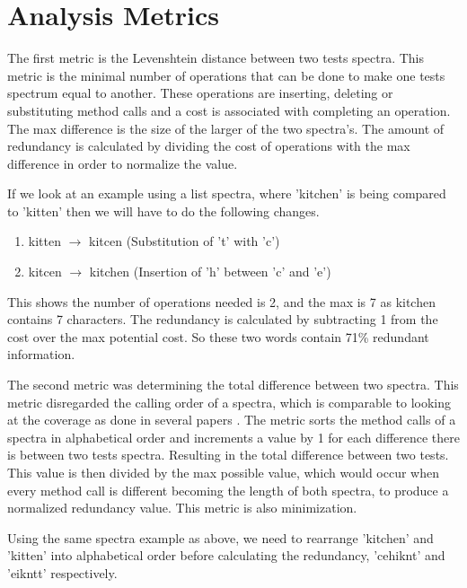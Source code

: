 \section{Analysis Metrics}
\label{S:metrics}

The first metric is the Levenshtein distance between two tests spectra. This metric is the minimal number of operations that can be done to make one tests spectrum equal to another. These operations are inserting, deleting or substituting method calls and a cost is associated with completing an operation. The max difference is the size of the larger of the two spectra's. The amount of redundancy is calculated by dividing the cost of operations with the max difference in order to normalize the value. 

If we look at an example using a list spectra, where 'kitchen' is being compared to 'kitten' then we will have to do the following changes.

\begin{enumerate}
\item kitten $\rightarrow$ kitcen (Substitution of 't' with 'c')
\item kitcen $\rightarrow$ kitchen (Insertion of 'h' between 'c' and 'e')
\end{enumerate}

This shows the number of operations needed is 2, and the max is 7 as kitchen contains 7 characters. The redundancy is calculated by subtracting 1 from the cost over the max potential cost. So these two words contain 71\% redundant information. 

The second metric was determining the total difference between two spectra. This metric disregarded the calling order of a spectra, which is comparable to looking at the coverage as done in several papers \cite{fraser2007redundancy,koochakzadeh2009test,zhang2011empirical,jeffrey2005test}. The metric sorts the method calls of a spectra in alphabetical order and increments a value by 1 for each difference there is between two tests spectra. Resulting in the total difference between two tests. This value is then divided by the max possible value, which would occur when every method call is different becoming the length of both spectra, to produce a normalized redundancy value. This metric is also minimization.

Using the same spectra example as above, we need to rearrange 'kitchen' and 'kitten' into alphabetical order before calculating the redundancy, 'cehiknt' and 'eikntt' respectively.

